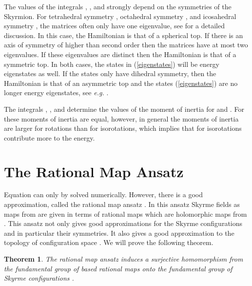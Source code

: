 \documentclass[a4paper,12pt]{article}
\newtheorem {theorem}{Theorem}[section]
\begin{document}
The values of the integrals \coordHE{}, \coordHE{}, and \coordHE{} strongly 
depend on the symmetries of the Skyrmion. For tetrahedral symmetry \coordHE{},
octahedral symmetry \coordHE{}, and icosahedral symmetry \coordHE{}, the matrices often
only have one eigenvalue, see \cite{Irwin:1998bs} 
for a detailed discussion. In this case, the Hamiltonian is that of a 
spherical top. If there is an axis of symmetry of higher than second order 
then the matrices have at most two eigenvalues. If these eigenvalues 
are distinct then the Hamiltonian is that of a symmetric top. In both 
cases, the states in (\ref{eigenstates}) will be energy eigenstates as 
well. If the states only have dihedral \coordHE{} symmetry, then the 
Hamiltonian is that of an asymmetric top and the states
(\ref{eigenstates}) are no longer energy eigenstates, see {\it e.g.}
\cite{Landau:1977}.

The integrals \coordHE{}, \coordHE{}, and \coordHE{} determine the values 
of the moment of inertia for \coordHE{} and \coordHE{}. For \coordHE{} these moments 
of inertia are equal, however, in general the moments of inertia 
are larger for rotations than for isorotations, which implies that 
for \coordHE{} isorotations contribute more to the energy.


\section{The Rational Map Ansatz}
\label{Rational}

Equation \myHighlight{$(\ref{Estandard})$}\coordHE{} can only by solved numerically. However,
there is a good approximation, called the rational map ansatz
\cite{Houghton:1998kg}. In this ansatz Skyrme fields as maps from \coordHE{} are given in terms of rational maps which are holomorphic
maps from \coordHE{}. 
This ansatz not only gives good approximations for 
the Skyrme configurations and in particular their symmetries. It 
also gives a good approximation to the topology of configuration 
space \coordHE{}. We will prove the following theorem.

\begin{theorem}
\label{t:FR}
The rational map ansatz induces a surjective homomorphism from the 
fundamental group of 
based rational maps \coordHE{} onto the fundamental group of 
Skyrme configurations \coordHE{}. 
\end{theorem}
\end{document}

